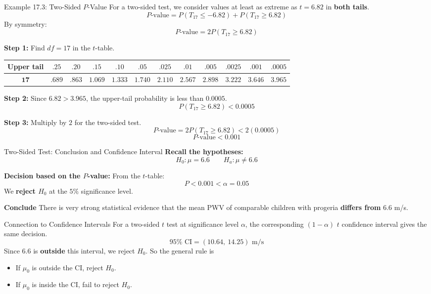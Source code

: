 \documentclass[aspectratio=169,10pt]{beamer}
\newcommand{\step}[1]{\textcolor{CourseBlue}{\textbf{#1}}\quad}
\begin{document}
\begin{frame}{Example 17.3: Two-Sided $P$-Value}
\small
For a two-sided test, we consider values at least as extreme as $t=6.82$ in \textbf{both tails}.
$$P\text{-value}=P(T_{17}\le-6.82)+P(T_{17}\ge6.82)$$
By symmetry:
$$P\text{-value}=2P(T_{17}\ge6.82)$$

\vspace{0.1cm}
\textbf{Step 1:} Find $df=17$ in the $t$-table.
\begin{center}
\scriptsize
\setlength{\tabcolsep}{3.2pt}
\renewcommand{\arraystretch}{1.4}
\begin{tabular}{c|ccccccccccc}
\toprule
\textbf{Upper tail}
& $.25$ & $.20$ & $.15$ & $.10$ & $.05$
& $.025$ & $.01$ & $.005$ & $.0025$
& $.001$ & $\mathbf{.0005}$ \\
\midrule
$\mathbf{17}$
& $.689$ & $.863$ & $1.069$ & $1.333$
& $1.740$ & $2.110$ & $2.567$ & $2.898$
& $3.222$ & $3.646$ & $\mathbf{3.965}$ \\
\bottomrule
\end{tabular}
\end{center}

\vspace{0.1cm}
\textbf{Step 2:} Since $6.82>3.965$, the upper-tail probability is less than $0.0005$.
$$P(T_{17}\ge6.82)<0.0005$$

\textbf{Step 3:} Multiply by $2$ for the two-sided test.
$$P\text{-value}=2P(T_{17}\ge6.82)<2(0.0005)$$
$$\boxed{P\text{-value}<0.001}$$
\end{frame}

\begin{frame}{Two-Sided Test: Conclusion and Confidence Interval}
\small
\textbf{Recall the hypotheses:}
$$H_0:\mu=6.6 \qquad H_a:\mu\neq6.6$$

\vspace{0.1cm}
\textbf{Decision based on the $P$-value:}
From the $t$-table:
$$\boxed{P<0.001<\alpha=0.05}$$
We \textbf{reject $H_0$} at the $5\%$ significance level.

\vspace{0.15cm}
\step{Conclude} There is very strong statistical evidence that the mean PWV of comparable children with progeria \textbf{differs from} $6.6$ m/s.

\vspace{0.2cm}
\begin{block}{Connection to Confidence Intervals}
For a two-sided $t$ test at significance level $\alpha$, the corresponding $(1-\alpha)$ $t$ confidence interval gives the same decision.
$$95\%\text{ CI}=(10.64,\ 14.25)\text{ m/s}$$
Since $6.6$ is \textbf{outside} this interval, we reject $H_0$. So the general rule is
\begin{itemize}
\item If $\mu_0$ is outside the CI, reject $H_0$.
\item If $\mu_0$ is inside the CI, fail to reject $H_0$.
\end{itemize}
\end{block}
\end{frame}
\end{document}
